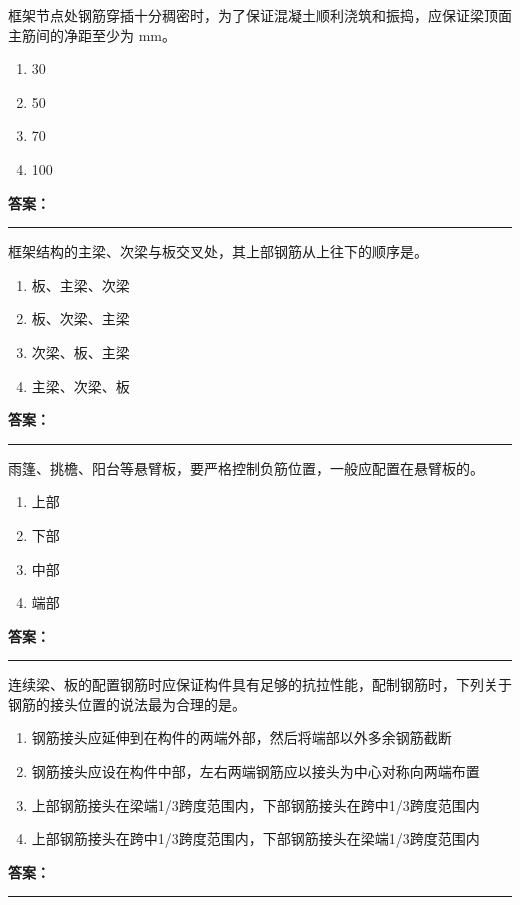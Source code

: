 \documentclass[UTF8,fontset=fandol,11pt]{ctexart}
\newcommand{\answerline}{\textcolor{answerred}{\rule{2.4cm}{0.7pt}}}
\begin{document}
\begin{quizbox}[title={第 25 题}]
框架节点处钢筋穿插十分稠密时，为了保证混凝土顺利浇筑和振捣，应保证梁顶面主筋间的净距至少为 mm。\\
\begin{enumerate}[label=\Alph*.]
\item 30
\item 50
\item 70
\item 100
\end{enumerate}
\textbf{\textcolor{answerred}{答案：}} \answerline
\end{quizbox}

\begin{quizbox}[title={第 26 题}]
框架结构的主梁、次梁与板交叉处，其上部钢筋从上往下的顺序是。\\
\begin{enumerate}[label=\Alph*.]
\item 板、主梁、次梁
\item 板、次梁、主梁
\item 次梁、板、主梁
\item 主梁、次梁、板
\end{enumerate}
\textbf{\textcolor{answerred}{答案：}} \answerline
\end{quizbox}

\begin{quizbox}[title={第 27 题}]
雨篷、挑檐、阳台等悬臂板，要严格控制负筋位置，一般应配置在悬臂板的。\\
\begin{enumerate}[label=\Alph*.]
\item 上部
\item 下部
\item 中部
\item 端部
\end{enumerate}
\textbf{\textcolor{answerred}{答案：}} \answerline
\end{quizbox}

\begin{quizbox}[title={第 28 题}]
连续梁、板的配置钢筋时应保证构件具有足够的抗拉性能，配制钢筋时，下列关于钢筋的接头位置的说法最为合理的是。\\
\begin{enumerate}[label=\Alph*.]
\item 钢筋接头应延伸到在构件的两端外部，然后将端部以外多余钢筋截断
\item 钢筋接头应设在构件中部，左右两端钢筋应以接头为中心对称向两端布置
\item 上部钢筋接头在梁端1/3跨度范围内，下部钢筋接头在跨中1/3跨度范围内
\item 上部钢筋接头在跨中1/3跨度范围内，下部钢筋接头在梁端1/3跨度范围内
\end{enumerate}
\textbf{\textcolor{answerred}{答案：}} \answerline
\end{quizbox}
\end{document}
